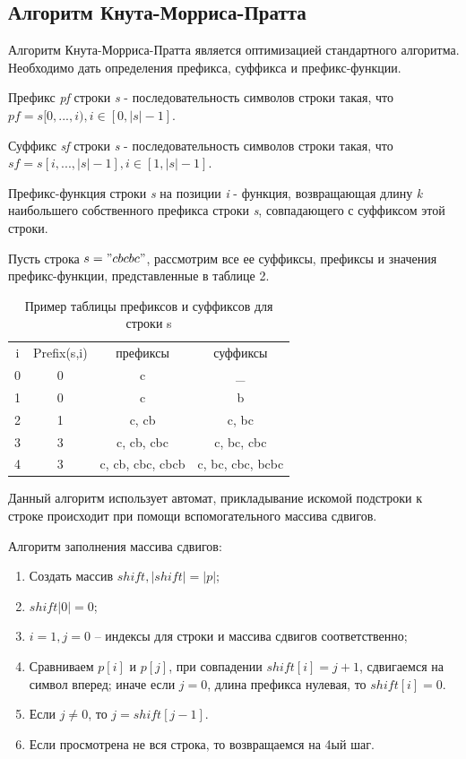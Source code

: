 \documentclass[12pt]{report}
\begin{document}
\subsection{Алгоритм Кнута-Морриса-Пратта}

Алгоритм Кнута-Морриса-Пратта является оптимизацией стандартного алгоритма. Необходимо дать определения префикса, суффикса и префикс-функции.

Префикс \textit{pf} строки \textit{s} - последовательность символов строки такая, что $pf=s[0,...,i), i \in [0, |s|-1]$.

Суффикс \textit{sf} строки \textit{s} - последовательность символов строки такая, что $sf=s[i,...,|s|-1], i \in [1, |s|-1]$.

Префикс-функция строки \textit{s} на позиции \textit{i} - функция, возвращающая длину \textit{k} наибольшего собственного префикса строки \textit{s}, совпадающего с суффиксом этой строки.

Пусть строка $s = "cbcbc"$, рассмотрим все ее суффиксы, префиксы и значения префикс-функции, представленные в таблице 2.

\begin{table}[h]
	\caption{Пример таблицы префиксов и суффиксов для строки s}
	\begin{center}
		\begin{tabular}{|c|c|c|c|}
			\hline
			i&Prefix(s,i)&префиксы&суффиксы\\
			0&0&c&\_\\
			1&0&c&b\\
			2&1&c, cb&c, bc\\
			3&3&c, cb, cbc&c, bc, cbc\\
			4&3&c, cb, cbc, cbcb&c, bc, cbc, bcbc\\
			\hline
		\end{tabular}
		\label{T:t1}	
	\end{center}
\end{table}

Данный алгоритм использует автомат, прикладывание искомой подстроки к строке происходит при помощи вспомогательного массива сдвигов.

Алгоритм заполнения массива сдвигов:
\begin{enumerate}
	\item Создать массив $shift, |shift| = |p|$;
	\item $shift|0| = 0$;
	\item $i=1,j=0$ -- индексы для строки и массива сдвигов соответственно;
	\item Сравниваем $p[i]$ и $p[j]$, при совпадении $shift[i] = j+1$, сдвигаемся на символ вперед; иначе если $j = 0$, длина префикса нулевая, то $shift[i] = 0$.
	\item Если $j \neq 0$, то $j = shift[j-1]$.
	\item Если просмотрена не вся строка, то возвращаемся на 4ый шаг.
\end{enumerate}
\end{document}

